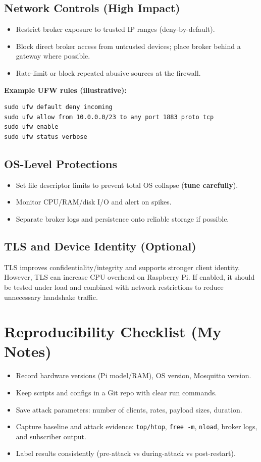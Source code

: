 \documentclass[11pt]{article}
\begin{document}
\subsection{Network Controls (High Impact)}
\begin{itemize}
  \item Restrict broker exposure to trusted IP ranges (deny-by-default).
  \item Block direct broker access from untrusted devices; place broker behind a gateway where possible.
  \item Rate-limit or block repeated abusive sources at the firewall.
\end{itemize}

\textbf{Example UFW rules (illustrative):}
\begin{lstlisting}[style=cmd]
sudo ufw default deny incoming
sudo ufw allow from 10.0.0.0/23 to any port 1883 proto tcp
sudo ufw enable
sudo ufw status verbose
\end{lstlisting}

\subsection{OS-Level Protections}
\begin{itemize}
  \item Set file descriptor limits to prevent total OS collapse (\textbf{tune carefully}).
  \item Monitor CPU/RAM/disk I/O and alert on spikes.
  \item Separate broker logs and persistence onto reliable storage if possible.
\end{itemize}

\subsection{TLS and Device Identity (Optional)}
TLS improves confidentiality/integrity and supports stronger client identity. However, TLS can increase CPU overhead on Raspberry Pi. If enabled, it should be tested under load and combined with network restrictions to reduce unnecessary handshake traffic.

\section{Reproducibility Checklist (My Notes)}
\begin{itemize}
  \item Record hardware versions (Pi model/RAM), OS version, Mosquitto version.
  \item Keep scripts and configs in a Git repo with clear run commands.
  \item Save attack parameters: number of clients, rates, payload sizes, duration.
  \item Capture baseline and attack evidence: \texttt{top/htop}, \texttt{free -m}, \texttt{nload}, broker logs, and subscriber output.
  \item Label results consistently (pre-attack vs during-attack vs post-restart).
\end{itemize}
\end{document}
